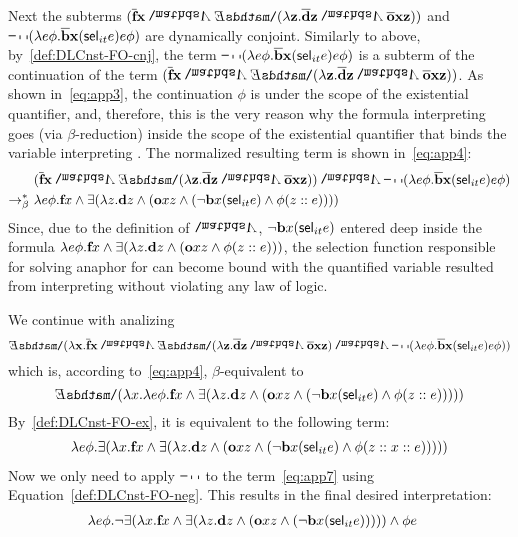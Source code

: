 Next the subterms $(\tr{\cfarmer}  \x2 \cnj2  \ex2 (\lambda \z2.  \tr{\cdonkey}  \z2 \cnj2 \tr{\cown}  \x2 \z2  ) )$ and $ \n2 ( \lambda e \phi. \tr{\cbeat}  \x2  ( \selK_{it} e ) e \phi  ) $ are dynamically conjoint. Similarly to above, by~\eqref{def:DLCnst-FO-cnj}, the term $ \n2 ( \lambda e \phi. \tr{\cbeat}  \x2  ( \selK_{it} e ) e \phi  )$ is a subterm of the continuation of the term $(\tr{\cfarmer}  \x2  \cnj2   \ex2 (\lambda \z2.  \tr{\cdonkey}  \z2 \cnj2 \tr{\cown}  \x2 \z2  ) ) $.  As shown in~\eqref{eq:app3}, the continuation $\phi$ is under the scope of the existential quantifier, and, therefore, this is the very reason why the formula interpreting  goes (via $\beta$-reduction) inside the scope of the existential quantifier that binds the variable interpreting . The normalized resulting term is shown in~\eqref{eq:app4}:
\begin{align}
& (\tr{\cfarmer}  \x2  \cnj2   \ex2 (\lambda \z2.  \tr{\cdonkey}  \z2 \cnj2 \tr{\cown}  \x2 \z2  ) )  \cnj2  \n2 ( \lambda e \phi. \tr{\cbeat}  \x2  ( \selK_{it} e ) e \phi  )  \notag \\
 \bred \ &  \lambda e \phi. \cfarmer \x1  \cnj1 \ex1 ( \lambda \z1. \cdonkey \z1  \cnj1 ( \cown \x1  \z1 \cnj1 ( \n1 \cbeat  \x1 ( \selK_{it} e ) \cnj1 \phi  (\z1::e) ) ))\label{eq:app4}
\end{align}
Since, due to the definition of $\cnj2$,  $\n1 \cbeat  \x1 ( \selK_{it} e )$ entered deep inside the formula $   \lambda e \phi. \cfarmer \x1  \cnj1 \ex1 ( \lambda \z1. \cdonkey \z1  \cnj1 ( \cown \x1  \z1 \cnj1 \phi  (\z1::e) ) )$, the selection function responsible for solving anaphor for  can become bound with the quantified variable resulted from interpreting  without violating any law of logic. %

We continue with analizing $$\ex2 (\lambda \x2.  \tr{\cfarmer}  \x2 \cnj2   \ex2 (\lambda \z2.  \tr{\cdonkey}  \z2 \cnj2 \tr{\cown}  \x2 \z2  )  \cnj2  \n2 ( \lambda e \phi. \tr{\cbeat}  \x2  ( \selK_{it} e ) e \phi  )) $$ which is, according to~\eqref{eq:app4}, $\beta$-equivalent to $$\ex2 (\lambda \x1. \lambda e \phi. \cfarmer \x1  \cnj1 \ex1 ( \lambda \z1. \cdonkey \z1  \cnj1 ( \cown \x1  \z1 \cnj1 ( \n1 \cbeat  \x1 ( \selK_{it} e ) \cnj1 \phi  (\z1::e) ) ))) $$ By~\eqref{def:DLCnst-FO-ex}, it is equivalent to the following term:
\begin{align}
\lambda e \phi. \ex1 (\lambda \x1.  \cfarmer \x1  \cnj1 \ex1 ( \lambda \z1. \cdonkey \z1  \cnj1 ( \cown \x1  \z1 \cnj1 ( \n1 \cbeat  \x1 ( \selK_{it} e ) \cnj1 \phi  (\z1::\x1::e) ) ))) \label{eq:app7}
\end{align}
Now we only need to apply $\n2$ to the term~\eqref{eq:app7} using Equation~\eqref{def:DLCnst-FO-neg}. This results in the final desired interpretation:
\begin{align}
& \lambda e \phi. \n1 \ex1 (\lambda \x1.  \cfarmer \x1  \cnj1 \ex1 ( \lambda \z1. \cdonkey \z1  \cnj1 ( \cown \x1  \z1 \cnj1 ( \n1 \cbeat  \x1 ( \selK_{it} e )  ) ))) \cnj1 \phi e \notag
\end{align}

